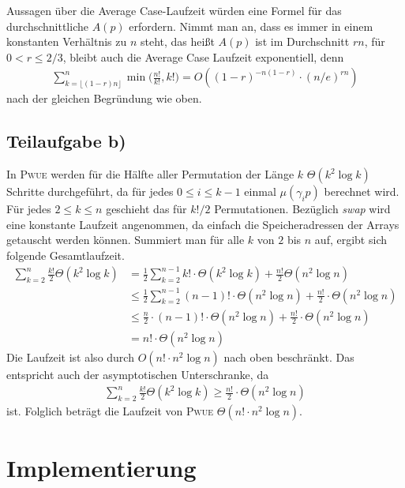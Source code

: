 \documentclass[a4paper, 10pt, ngerman]{article}
\begin{document}
Aussagen über die Average Case-Laufzeit würden eine Formel für das durchschnittliche $A(p)$ erfordern. Nimmt man an, dass es immer in einem konstanten Verhältnis zu $n$ steht, das heißt $A(p)$ ist im Durchschnitt $rn$, für $0 < r \le 2/3$, bleibt auch die Average Case Laufzeit exponentiell, denn
\begin{align*}
    \sum_{k = \lfloor (1 - r)n \rfloor}^n \min \bigg ( \frac {n!}{k!}, k! \bigg ) 
    = O((1 - r)^{-n(1 - r)} \cdot (n/e)^{rn}) 
\end{align*}
nach der gleichen Begründung wie oben.

\subsection{Teilaufgabe b)}

In \textsc{Pwue} werden für die Hälfte aller Permutation der Länge $k$ $\Theta(k^2 \log k)$ Schritte durchgeführt, da für jedes $0 \le i \le k - 1$ einmal $\mu(\gamma_i p)$ berechnet wird. Für jedes $2 \le k \le n$ geschieht das für $k! / 2$ Permutationen. Bezüglich \emph{swap} wird eine konstante Laufzeit angenommen, da einfach die Speicheradressen der Arrays getauscht werden können. Summiert man für alle $k$ von $2$ bis $n$ auf, ergibt sich folgende Gesamtlaufzeit.
\begin{align*}
    \sum_{k = 2}^{n} \frac {k!} 2 \Theta(k^2 \log k)
     & = \frac 1 2 \sum_{k = 2}^{n - 1} k! \cdot \Theta(k^2 \log k) + \frac {n!} 2 \Theta(n^2 \log n) \\
     & \le \frac 1 2 \sum_{k = 2}^{n - 1} (n - 1)! \cdot \Theta(n^2 \log n) + \frac {n!} 2 \cdot \Theta(n^2 \log n) \\
     & \le \frac n 2 \cdot (n - 1)! \cdot \Theta(n^2 \log n) + \frac{n!} 2 \cdot \Theta(n^2 \log n)                 \\
     & = n! \cdot \Theta(n^2 \log n)
\end{align*}
Die Laufzeit ist also durch $O(n! \cdot n^2 \log n)$ nach oben beschränkt. Das entspricht auch der asymptotischen Unterschranke, da
\begin{align*}
    \sum_{k = 2}^{n} \frac {k!} 2 \Theta(k^2 \log k)
    \ge \frac {n!} 2 \cdot \Theta(n^2 \log n)
\end{align*}
ist. Folglich beträgt die Laufzeit von \textsc{Pwue} $\Theta(n! \cdot n^2 \log n)$.

\section{Implementierung}
\end{document}
